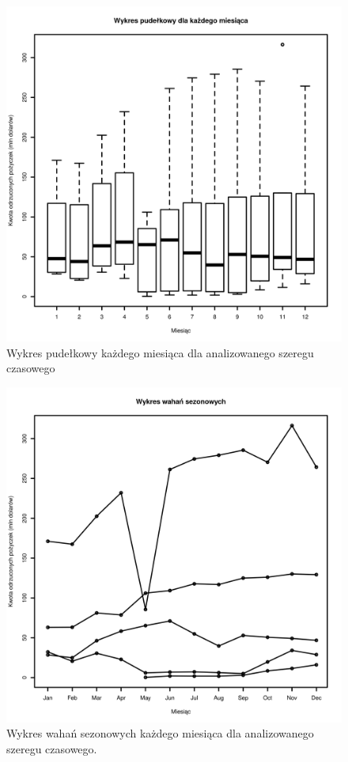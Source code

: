 \documentclass[11pt]{article}
\begin{document}
\begin{figure}[h]

    \centering
	\includegraphics[width=\textwidth]{images/data_monthly_train_pudelkowy.png}
    \caption{Wykres pudełkowy każdego miesiąca dla analizowanego szeregu czasowego}
    \label{fig:data_monthly_train_pudelkowy}

\end{figure}

\begin{figure}[h]

    \centering
	\includegraphics[width=\textwidth]{images/data_monthly_train_sezonowy_ogolny.png}
    \caption{Wykres wahań sezonowych każdego miesiąca dla analizowanego szeregu czasowego.}
    \label{fig:data_monthly_train_sezonowy_ogolny}

\end{figure}
\end{document}
